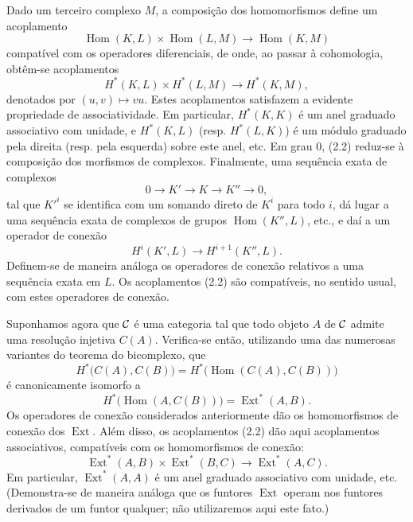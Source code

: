 Dado um terceiro complexo $M$, a composição dos homomorfismos
define um acoplamento
\[
  \operatorname{Hom}(K,L)\times\operatorname{Hom}(L,M)
  \longrightarrow\operatorname{Hom}(K,M)
\]
compatível com os operadores diferenciais, de onde, ao passar à cohomologia,
obtêm-se acoplamentos
\begin{equation}\tag{2.2}
  H^{*}(K,L)\times H^{*}(L,M)\longrightarrow H^{*}(K,M),
\end{equation}
denotados por $(u,v)\longmapsto vu$. Estes acoplamentos satisfazem a evidente propriedade
de associatividade. Em particular, $H^{*}(K,K)$ é um anel graduado associativo
com unidade, e $H^{*}(K,L)$ (resp. $H^{*}(L,K)$) é um módulo graduado pela direita
(resp. pela esquerda) sobre este anel, etc. Em grau $0$, (2.2) reduz-se à
composição dos morfismos de complexos. Finalmente, uma sequência exata de
complexos
\[
  0\longrightarrow K'\longrightarrow K\longrightarrow K''\longrightarrow 0,
\]
tal que $K'^{i}$ se identifica com um somando direto de $K^{i}$ para todo $i$,
dá lugar a uma sequência exata de complexos de grupos
$\operatorname{Hom}(K'',L)$, etc., e daí a um operador de conexão
\[
  H^{i}(K',L)\longrightarrow H^{i+1}(K'',L).
\]
Definem-se de maneira análoga os operadores de conexão relativos a uma sequência exata em $L$. Os
acoplamentos (2.2) são compatíveis, no sentido usual, com estes operadores de conexão.

Suponhamos agora que $\mathcal C$ é uma categoria tal que todo objeto $A$
de $\mathcal C$ admite uma resolução injetiva $C(A)$. Verifica-se então, utilizando
uma das numerosas variantes do teorema do bicomplexo, que
\[
  H^{*}\bigl(C(A),C(B)\bigr)
  =H^{*}\bigl(\operatorname{Hom}(C(A),C(B))\bigr)
\]
é canonicamente isomorfo a
\[
  H^{*}\bigl(\operatorname{Hom}(A,C(B))\bigr)
  =\operatorname{Ext}^{*}(A,B).
\]
Os operadores de conexão considerados anteriormente dão os homomorfismos de conexão dos
$\operatorname{Ext}$. Além disso, os acoplamentos (2.2) dão aqui
acoplamentos associativos, compatíveis com os homomorfismos de conexão:
\begin{equation}\tag{2.3}
  \operatorname{Ext}^{*}(A,B)\times\operatorname{Ext}^{*}(B,C)
  \longrightarrow\operatorname{Ext}^{*}(A,C).
\end{equation}
Em particular, $\operatorname{Ext}^{*}(A,A)$ é um anel graduado associativo
com unidade, etc. (Demonstra-se de maneira análoga que os funtores
$\operatorname{Ext}$ operam nos funtores derivados de um funtor
qualquer; não utilizaremos aqui este fato.)

